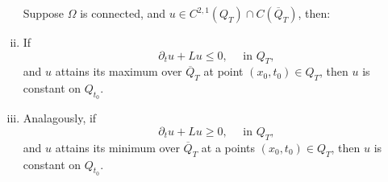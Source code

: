 \documentclass[11pt, a4paper]{article}
\begin{document}
\begin{theorem}
\begin{enumerate}[i)]
	Suppose $\Omega$ is connected, and $u\in C^{2,1}(Q_T)\cap C(\overline{Q}_T)$, then:
	\item If
	\begin{equation*}
		\partial_tu + Lu \leq 0, \quad \text{ in } Q_T, 
	\end{equation*}
	and $u$ attains its maximum over $\overline{Q}_T$ at point $(x_0,t_0)\in Q_T$, then
	$u$ is constant on $Q_{t_0}$.
	
	\item Analagously, if
	\begin{equation*}
		\partial_tu + Lu \geq 0, \quad \text{ in } Q_T, 
	\end{equation*}
	and $u$ attains its minimum over $\overline{Q}_T$ at a points  $(x_0,t_0) \in Q_T$, then $u$ is constant on $Q_{t_0}$.
\end{enumerate}
\end{theorem}
\end{document}
